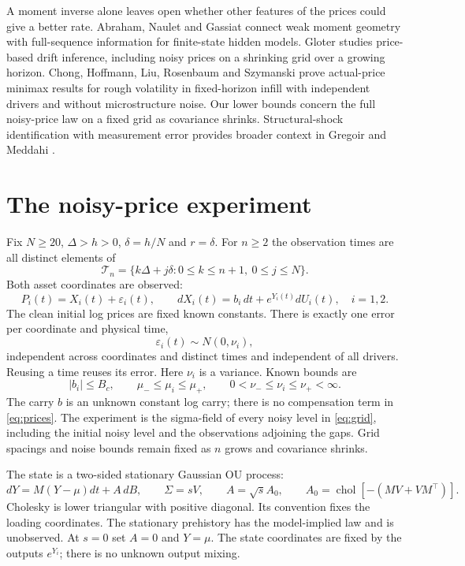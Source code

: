 \documentclass[11pt,a4paper]{amsart}
\theoremstyle{plain}
\theoremstyle{definition}
\theoremstyle{remark}
\DeclareMathOperator{\chol}{chol}
\begin{document}
A moment inverse alone leaves open whether other features of the prices
could give a better rate. Abraham, Naulet and Gassiat
\cite{AbrahamNauletGassiat2022} connect weak moment geometry with
full-sequence information for finite-state hidden models. Gloter
\cite{Gloter2007} studies price-based drift inference, including noisy
prices on a shrinking grid over a growing horizon. Chong, Hoffmann, Liu,
Rosenbaum and Szymanski \cite{ChongEtAl2024} prove actual-price minimax
results for rough volatility in fixed-horizon infill with independent
drivers and without microstructure noise. Our lower bounds concern the
full noisy-price law on a fixed grid as covariance shrinks.
Structural-shock identification with measurement error provides broader
context in Gregoir and Meddahi \cite{GregoirMeddahi2025}.

\section{The noisy-price experiment}\label{sec:model}

Fix $N\ge20$, $\Delta>h>0$, $\delta=h/N$ and $r=\delta$. For $n\ge2$ the
observation times are all distinct elements of
\begin{equation}\label{eq:grid}
 \mathcal T_n=\{k\Delta+j\delta:0\le k\le n+1,\ 0\le j\le N\}.
\end{equation}
Both asset coordinates are observed:
\begin{equation}\label{eq:prices}
 P_i(t)=X_i(t)+\varepsilon_i(t),\qquad
 dX_i(t)=b_i\,dt+e^{Y_i(t)}dU_i(t),\quad i=1,2.
\end{equation}
The clean initial log prices are fixed known constants. There is exactly
one error per coordinate and physical time,
\[
 \varepsilon_i(t)\sim N(0,\nu_i),
\]
independent across coordinates and distinct times and independent of all
drivers. Reusing a time reuses its error. Here $\nu_i$ is a
variance. Known bounds are
\begin{equation}\label{eq:nuisance-bounds}
 |b_i|\le B_c,\qquad \mu_-\le\mu_i\le\mu_+,\qquad
 0<\nu_-\le\nu_i\le\nu_+<\infty.
\end{equation}
The carry $b$ is an unknown constant log carry; there is no
compensation term in \eqref{eq:prices}. The experiment is the sigma-field
of every noisy level in \eqref{eq:grid}, including the initial noisy level
and the observations adjoining the gaps. Grid spacings and noise bounds
remain fixed as $n$ grows and covariance shrinks.

The state is a two-sided stationary Gaussian OU process:
\begin{equation}\label{eq:state}
 dY=M(Y-\mu)dt+A\,dB,\qquad
 \Sigma=sV,\qquad A=\sqrt{s}A_0,\qquad
 A_0=\chol[-(MV+VM^\top)].
\end{equation}
Cholesky is lower triangular with positive diagonal. Its convention fixes
the loading coordinates. The stationary prehistory has the model-implied
law and is unobserved. At $s=0$ set $A=0$ and $Y=\mu$.
The state coordinates are fixed by the outputs $e^{Y_i}$; there is no
unknown output mixing.
\end{document}
